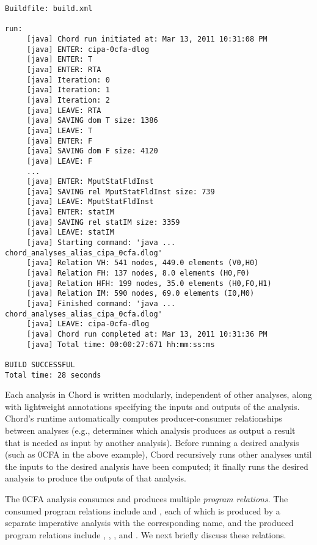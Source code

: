 \begin{framed}
{\small
\begin{verbatim}
Buildfile: build.xml

run:
     [java] Chord run initiated at: Mar 13, 2011 10:31:08 PM
     [java] ENTER: cipa-0cfa-dlog
     [java] ENTER: T
     [java] ENTER: RTA
     [java] Iteration: 0
     [java] Iteration: 1
     [java] Iteration: 2
     [java] LEAVE: RTA
     [java] SAVING dom T size: 1386
     [java] LEAVE: T
     [java] ENTER: F
     [java] SAVING dom F size: 4120
     [java] LEAVE: F
     ...
     [java] ENTER: MputStatFldInst
     [java] SAVING rel MputStatFldInst size: 739
     [java] LEAVE: MputStatFldInst
     [java] ENTER: statIM
     [java] SAVING rel statIM size: 3359
     [java] LEAVE: statIM
     [java] Starting command: 'java ... chord_analyses_alias_cipa_0cfa.dlog'
     [java] Relation VH: 541 nodes, 449.0 elements (V0,H0)
     [java] Relation FH: 137 nodes, 8.0 elements (H0,F0)
     [java] Relation HFH: 199 nodes, 35.0 elements (H0,F0,H1)
     [java] Relation IM: 590 nodes, 69.0 elements (I0,M0)
     [java] Finished command: 'java ... chord_analyses_alias_cipa_0cfa.dlog'
     [java] LEAVE: cipa-0cfa-dlog
     [java] Chord run completed at: Mar 13, 2011 10:31:36 PM
     [java] Total time: 00:00:27:671 hh:mm:ss:ms

BUILD SUCCESSFUL
Total time: 28 seconds
\end{verbatim}
}
\end{framed}

Each analysis in Chord is written modularly, independent of other analyses,
along with lightweight annotations specifying the inputs and outputs of the
analysis.  Chord's runtime automatically computes producer-consumer
relationships between analyses (e.g., determines which analysis produces as
output a result that is needed as input by another analysis).  Before running a
desired analysis (such as 0CFA in the above example), Chord recursively runs
other analyses until the inputs to the desired analysis have been computed; it
finally runs the desired analysis to produce the outputs of that analysis.

The 0CFA analysis consumes and produces multiple {\it program relations}.  The
consumed program relations include  and ,
each of which is produced by a separate imperative analysis with the
corresponding name, and the produced program relations include ,
, , and .  We next briefly discuss these relations.

